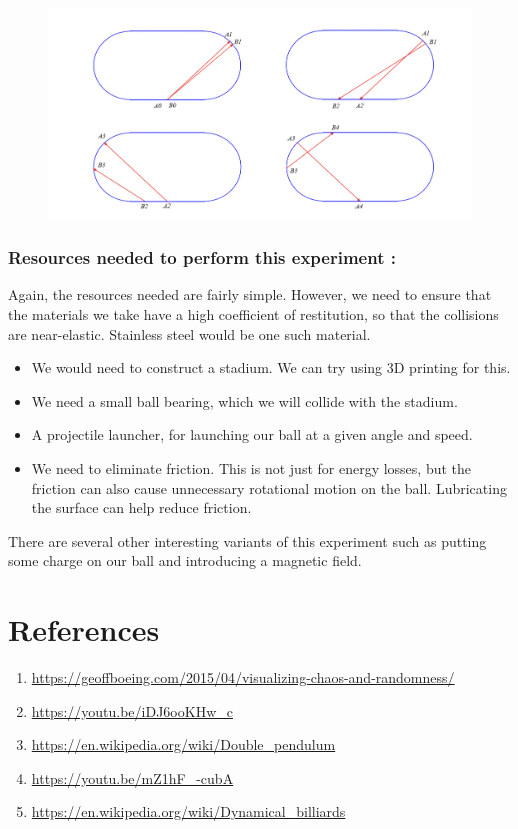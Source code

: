 \documentclass{article}
\begin{document}
\begin{figure}[h]
    \centering
    \includegraphics[scale = 0.50]{billiards}
\end{figure}
\subsubsection*{Resources needed to perform this experiment :}
Again, the resources needed are fairly simple. However, we need to ensure that the materials we take have a high coefficient of restitution, so that the collisions are near-elastic. Stainless steel would be one such material.
\begin{itemize}
    \item We would need to construct a stadium. We can try using 3D printing for this.
    \item We need a small ball bearing, which we will collide with the stadium.
    \item A projectile launcher, for launching our ball at a given angle and speed.
    \item We need to eliminate friction. This is not just for energy losses, but the friction can also cause unnecessary rotational motion on the ball. Lubricating the surface can help reduce friction.
\end{itemize}
There are several other interesting variants of this experiment such as putting some charge on our ball and introducing a magnetic field.
\section*{References}

\begin{enumerate}

\item \url{https://geoffboeing.com/2015/04/visualizing-chaos-and-randomness/}

\item \url{https://youtu.be/iDJ6ooKHw_c}

\item \url{https://en.wikipedia.org/wiki/Double_pendulum}

\item \url{https://youtu.be/mZ1hF_-cubA}

\item \url{https://en.wikipedia.org/wiki/Dynamical_billiards}


\end{enumerate}
\end{document}
